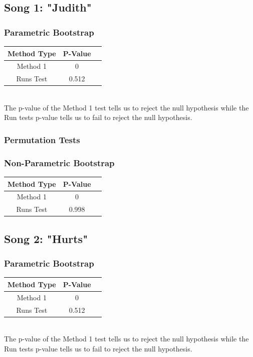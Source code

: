 \documentclass[12pt, letterpaper]{article}
\begin{document}
\subsection{Song 1: "Judith"}
\subsubsection{Parametric Bootstrap}
\begin{tabular}{|c|c|c|}
\hline
\textbf{Method Type} & P-Value \\
\hline
Method 1 & 0 \\
\hline
Runs Test & 0.512 \\ 
\hline
\end{tabular} \\
The p-value of the Method 1 test tells us to reject the null hypothesis while the Run tests p-value tells us to fail to reject the null hypothesis.

\subsubsection{Permutation Tests}

\subsubsection{Non-Parametric Bootstrap}
\begin{tabular}{|c|c|c|}
\hline
\textbf{Method Type} & P-Value \\
\hline
Method 1 & 0 \\
\hline
Runs Test & 0.998 \\ 
\hline
\end{tabular}

\subsection{Song 2: "Hurts"}
\subsubsection{Parametric Bootstrap}
\begin{tabular}{|c|c|c|}
\hline
\textbf{Method Type} & P-Value \\
\hline
Method 1 & 0  \\
\hline
Runs Test & 0.512 \\ 
\hline
\end{tabular} \\
The p-value of the Method 1 test tells us to reject the null hypothesis while the Run tests p-value tells us to fail to reject the null hypothesis.
\end{document}
